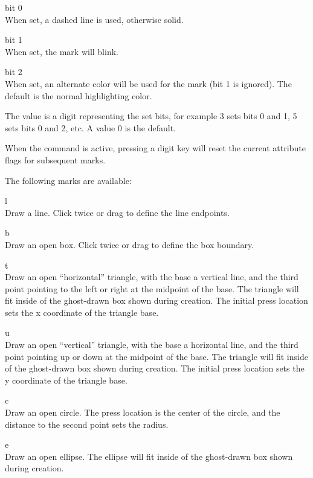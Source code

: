 \begin{description}
\item{bit 0}\\
When set, a dashed line is used, otherwise solid.
\item{bit 1}\\
When set, the mark will blink.
\item{bit 2}\\
When set, an alternate color will be used for the mark (bit 1 is
ignored).  The default is the normal highlighting color.
\end{description}

The value is a digit representing the set bits, for example 3 sets bits 0
and 1, 5 sets bits 0 and 2, etc.  A value 0 is the default.

When the command is active, pressing a digit key will reset the current
attribute flags for subsequent marks.

The following marks are available:
\begin{description}
\item{\vt l}\\
Draw a line.  Click twice or drag to define the line endpoints.

\item{\vt b}\\
Draw an open box.  Click twice or drag to define the box boundary.

\item{\vt t}\\
Draw an open ``horizontal'' triangle, with the base a vertical line,
and the third point pointing to the left or right at the midpoint of
the base.  The triangle will fit inside of the ghost-drawn box shown
during creation.  The initial press location sets the x coordinate of
the triangle base.

\item{\vt u}\\
Draw an open ``vertical'' triangle, with the base a horizontal line,
and the third point pointing up or down at the midpoint of the base. 
The triangle will fit inside of the ghost-drawn box shown during
creation.  The initial press location sets the y coordinate of the
triangle base.

\item{\vt c}\\
Draw an open circle.  The press location is the center of the circle,
and the distance to the second point sets the radius.

\item{\vt e}\\
Draw an open ellipse.  The ellipse will fit inside of the ghost-drawn
box shown during creation.
\end{description}

